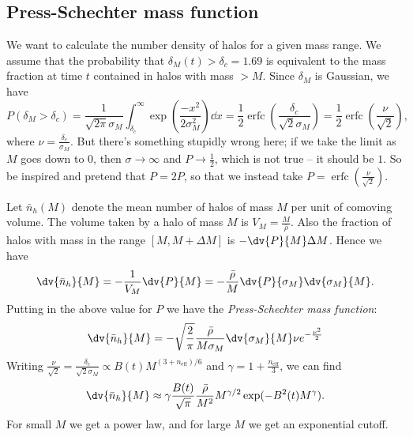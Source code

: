 \documentclass{jknotes}
\begin{document}
\subsection{Press-Schechter mass function}
We want to calculate the number density of halos for a given mass range. We assume that the probability that \(\delta_M(t)>\delta_c = 1.69\) is equivalent to the mass fraction at time \(t\) contained in halos with mass \(>M\). Since \(\delta_M\) is Gaussian, we have
\begin{equation}
    P(\delta_M>\delta_c) = \frac1{\sqrt{2\pi}\sigma_M} \int^\infty_{\delta_c}\exp(\frac{-x^2}{2\sigma^2_M})\dd{x} = \frac12 \operatorname{erfc}\left(\frac{\delta_c}{\sqrt2 \sigma_M}\right) = \frac12\operatorname{erfc}\left(\frac\nu{\sqrt{2}}\right),
\end{equation}
where \(\nu = \frac{\delta_c}{\sigma_M}\). But there's something stupidly wrong here; if we take the limit as \(M\) goes down to \(0\), then \(\sigma \to \infty\) and \(P \to \frac12\), which is not true -- it should be \(1\). So be inspired and pretend that \(P=2P\), so that we instead take \(P=\operatorname{erfc}\left(\frac\nu{\sqrt2}\right)\). 

Let \(\bar{n}_h(M)\) denote the mean number of halos of mass \(M\) per unit of comoving volume. The volume taken by a halo of mass \(M\) is \(V_M = \frac{M}{\bar\rho}\). Also the fraction of halos with mass in the range \([M,M+\Delta M]\) is \(-\dv{P}{M}\Delta M\). Hence we have
\begin{equation}
    \dv{\bar{n}_h}{M} = -\frac1{V_M}\dv{P}{M} = - \frac{\bar\rho}{M}\dv{P}{\sigma_M}\dv{\sigma_M}{M}.
\end{equation}
Putting in the above value for \(P\) we have the \emph{Press-Schechter mass function}:
\begin{equation}
    \dv{\bar{n}_h}{M} = -\sqrt{\frac{2}{\pi}} \frac{\bar\rho}{M\sigma_M} \dv{\sigma_M}{M} \nu e^{-\frac{\nu^2}{2}}
\end{equation}
Writing \(\frac{\nu}{\sqrt{2}} = \frac{\delta_c}{\sqrt{2}\sigma_M} \propto B(t) M^{(3+n_{\text{eff}})/6}\) and \(\gamma = 1 + \frac{n_{\text{eff}}}{3}\), we can find
\begin{equation}
    \dv{\bar{n}_h}{M} \approx \gamma \frac{B(t)}{\sqrt{\pi}}\frac{\bar\rho}{M^2} M^{\gamma/2} \exp(-B^2(t) M^\gamma).
\end{equation}
For small \(M\) we get a power law, and for large \(M\) we get an exponential cutoff.
\end{document}
